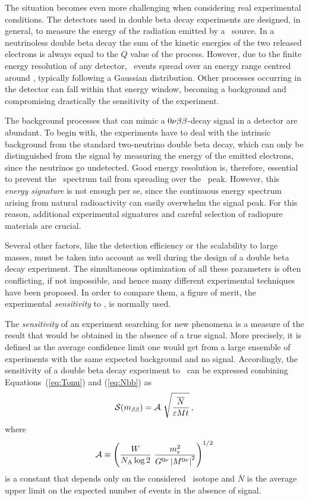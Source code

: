 \documentclass{PoS}
\begin{document}
The situation becomes even more challenging when considering real experimental conditions. The detectors used in double beta decay experiments are designed, in general, to measure the energy of the radiation emitted by a \bb\ source. In a neutrinoless double beta decay the sum of the kinetic energies of the two released electrons is always equal to the $Q$ value of the process. However, due to the finite energy resolution of any detector, \bbonu\ events spread over an energy range centred around \Qbb, typically following a Gaussian distribution. Other processes occurring in the detector can fall within that energy window, becoming a background and compromising drastically the sensitivity of the experiment.

The background processes that can mimic a $0\nu\beta\beta$-decay signal in a detector are abundant. To begin with, the experiments have to deal with the intrinsic background from the standard two-neutrino double beta decay, which can only be distinguished from the signal by measuring the energy of the emitted electrons, since the neutrinos go undetected. Good energy resolution is, therefore, essential to prevent the \bbtnu\ spectrum tail from spreading over the \bbonu\ peak. However, this \emph{energy signature} is not enough per se, since the continuous energy spectrum arising from natural radioactivity can easily overwhelm the signal peak. For this reason, additional experimental signatures and careful selection of radiopure materials are crucial. 

Several other factors, like the detection efficiency or the scalability to large masses, must be taken into account as well during the design of a double beta decay experiment. The simultaneous optimization of all these parameters is often conflicting, if not impossible, and hence many different experimental techniques have been proposed. In order to compare them, a figure of merit, the experimental \emph{sensitivity} to \mbb, is normally used. 

The \emph{sensitivity} of an experiment searching for new phenomena is a measure of the result that would be obtained in the absence of a true signal. More precisely, it is defined as the average confidence limit one would get from a large ensemble of experiments with the same expected background and no signal. Accordingly, the sensitivity of a double beta decay experiment to \mbb\ can be expressed combining Equations~(\ref{eq:Tonu}) and (\ref{eq:Nbb}) as
\begin{equation}
\mathcal{S}(\mbb) = \mathcal{A}\ \sqrt{\frac{\overline{N}}{\varepsilon Mt}}\,, \label{eq:Sensitivity1}
\end{equation}
where
\begin{equation}
\mathcal{A} \equiv \left(\frac{W}{N_\mathrm{A}\log2}\ \frac{m_{e}^{2}}{G^{0\nu}\left|M^{0\nu}\right|^{2}} \right)^{1/2}
\end{equation}
is a constant that depends only on the considered \bb\ isotope and $\overline{N}$ is the average upper limit on the expected number of events in the absence of signal.
\end{document}
